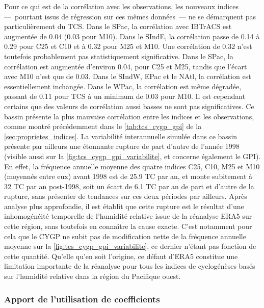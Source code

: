 \documentclass[../main.tex]{subfiles}
\begin{document}
Pour ce qui est de la corrélation avec les observations, les nouveaux indices ---~pourtant issus de régression sur ces mêmes données~--- ne se démarquent pas
particulièrement du TCS. Dans le SPac, la corrélation avec IBTrACS est augmentée de \num{0.04} (\num{0.03} pour M10). Dans le SIndE, la corrélation passe de
\num{0.14} à \num{0.29} pour C25 et C10 et à \num{0.32} pour M25 et M10. Une corrélation de \num{0.32} n'est toutefois probablement pas statistiquement
significative. Dans le SPac, la corrélation est augmentée d'environ \num{0.04}, pour C25 et M25, tandis que l'écart avec M10 n'est que de \num{0.03}. Dans le
SIndW, EPac et le NAtl, la corrélation est essentiellement inchangée. Dans le WPac, la corrélation est même dégradée, passant de \num{0.11} pour TCS à un
minimum de \num{0.03} pour M10. Il est cependant certains que des valeurs de corrélation aussi basses ne sont pas significatives. Ce bassin présente la plus
mauvaise corrélation entre les indices et les observations, comme montré précédemment dans le \cref{tab:tcs_cygp_gpi} de la \cref{sec:proprietes_indices}. La
variabilité interannuelle simulée dans ce bassin présente par ailleurs une étonnante rupture de part d'autre de l'année \num{1998} (visible aussi sur la
\cref{fig:tcs_cygp_gpi_variabilite}, et concerne également le GPI). En effet, la fréquence annuelle moyenne des quatre indices C25, C10, M25 et M10 (moyennés
entre eux) avant 1998 est de \num{25.9} TC par an, et monte subitement à \num{32} TC par an post-\num{1998}, soit un écart de \num{6.1} TC par an de part et
d'autre de la rupture, sans présenter de tendances sur ces deux périodes par ailleurs. Après analyse plus approfondie, il est établit que cette rupture est le
résultat d'une inhomogénéité temporelle de l'humidité relative issue de la réanalyse ERA5 sur cette région, sans toutefois en connaître la cause exacte. C'est
notamment pour cela que le CYGP ne subit pas de modification nette de la fréquence annuelle moyenne sur la \cref{fig:tcs_cygp_gpi_variabilite}, ce dernier
n'étant pas fonction de cette quantité. Qu'elle qu'en soit l'origine, ce défaut d'ERA5 constitue une limitation importante de la réanalyse pour tous les indices
de cyclogénèses basés sur l'humidité relative dans la région du Pacifique ouest.

\subsubsection{Apport de l'utilisation de coefficients }\label{sec:diagnostique_rang}
\end{document}
